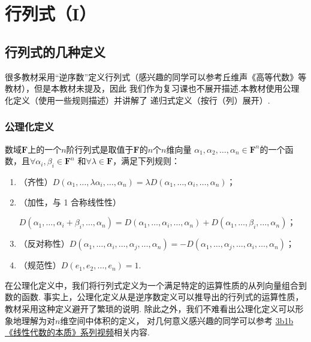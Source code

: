 \chapter{行列式（I）}

\section{行列式的几种定义}
很多教材采用``逆序数''定义行列式（感兴趣的同学可以参考丘维声《高等代数》等教材），但是本教材未提及，因此
我们作为复习课也不展开描述.本教材使用公理化定义（使用一些规则描述）并讲解了
递归式定义（按行（列）展开）.

\subsection{公理化定义}
\begin{definition} \label{def:11:axiomatic-def}
    数域$\mathbf{F}$上的一个$n$阶行列式是取值于$\mathbf{F}$的$n$个$n$维向量
    $\alpha_1,\alpha_2,\ldots,\alpha_n \in \mathbf{F}^n$的一个函数，且$\forall \alpha_i,\beta_i \in \mathbf{F}^n$
    和$\forall \lambda \in \mathbf{F}$，满足下列规则：
    \begin{enumerate}
        \item（齐性）$D(\alpha_1,\ldots,\lambda\alpha_i,\ldots,\alpha_n)=\lambda D(\alpha_1,\ldots,\alpha_i,\ldots,\alpha_n)$；

        \item（加性，与 1 合称线性性）

        $D(\alpha_1,\ldots,\alpha_i+\beta_i,\ldots,\alpha_n)=D(\alpha_1,\ldots,\alpha_i,\ldots,\alpha_n)+D(\alpha_1,\ldots,\beta_i,\ldots,\alpha_n)$；

        \item（反对称性）$D(\alpha_1,\ldots,\alpha_i,\ldots,\alpha_j,\ldots,\alpha_n)=-D(\alpha_1,\ldots,\alpha_j,\ldots,\alpha_i,\ldots,\alpha_n)$；

        \item（规范性）$D(e_1,e_2,\ldots,e_n)=1$.
    \end{enumerate}
\end{definition}
在公理化定义中，我们将行列式定义为一个满足特定的运算性质的从列向量组合到数的函数.
事实上，公理化定义从是逆序数定义可以推导出的行列式的运算性质，教材采用这种定义避开了繁琐的说明.
除此之外，我们不难看出公理化定义可以形象地理解为对$n$维空间中体积的定义，
对几何意义感兴趣的同学可以参考 \href{https://b23.tv/BV1ys411472E}{3b1b《线性代数的本质》系列视频}相关内容.
